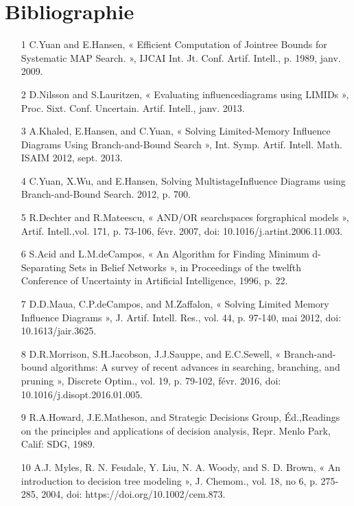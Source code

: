 \documentclass[12pt]{article}
\begin{document}
\section{Bibliographie}
\begin{itemize}

\item [1] C.Yuan and E.Hansen, « Efficient Computation of Join\-tree Bounds for Systematic MAP Search. », IJCAI Int. Jt. Conf. Artif. Intell., p. 1989, janv. 2009. 

\item[2] D.Nilsson and S.Lauritzen, « Evaluating influence\-diagrams using LIMIDs », Proc. Sixt. Conf. Uncertain. Artif. Intell., janv. 2013.

\item[3] A.Khaled, E.Hansen, and C.Yuan, « Solving Limited-Memory Influence Diagrams Using Branch-and-Bound Search », Int. Symp. Artif. Intell. Math. ISAIM 2012, sept. 2013.

\item[4] C.Yuan, X.Wu, and E.Hansen, Solving Multistage\-Influence Diagrams using Branch-and-Bound Search. 2012, p. 700.

\item[5] R.Dechter and R.Mateescu, « AND/OR searchspaces for\-graphical models », Artif. Intell.,vol. 171, p. 73‐106, févr. 2007, doi: 10.1016/j.artint.2006.11.003.

\item[6] S.Acid and L.M.deCampos, « An Algorithm for Finding Minimum d-Separating Sets in Belief Networks », in Proceedings of the twelfth Conference of Uncertainty in Artificial Intelligence,
1996, p. 22.

\item[7] D.D.Maua, C.P.deCampos, and M.Zaffalon, « Solving Limited Memory Influence Diagrams », J. Artif. Intell. Res., vol. 44, p. 97‐140, mai 2012, doi: 10.1613/jair.3625.

\item[8] D.R.Morrison, S.H.Jacobson, J.J.Sauppe, and E.C.Sewell, « Branch-and-bound algorithms: A survey of recent advances in searching, branching, and pruning », Discrete Optim., vol. 19, p. 79‐102, févr. 2016, doi: 10.1016/j.disopt.2016.01.005.

\item[9] R.A.Howard, J.E.Matheson, and Strategic Decisions Group, Éd.,Readings on the principles and applications of decision analysis, Repr. Menlo Park, Calif: SDG, 1989.

\item[10] A.J. Myles, R. N. Feudale, Y. Liu, N. A. Woody, and S. D. Brown, « An introduction to decision tree modeling », J. Chemom., vol. 18, no 6, p. 275‐285, 2004, doi:
https://doi.org/10.1002/cem.873.


\end{itemize}
\end{document}
